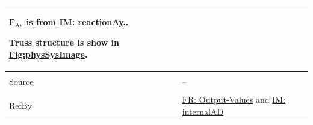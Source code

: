 \documentclass[12pt]{article}
\begin{document}
\begin{minipage}{\textwidth}
\begin{tabular}{>{\raggedright}p{}>{\raggedright\arraybackslash}p{}}
        ${\mathbf{F}_{\text{Ay}}}$ is from \hyperref[IM:reactionAy]{IM: reactionAy}..
        
        Truss structure is show in \hyperref[Figure:physSysImage]{Fig:physSysImage}.
        
\\ \midrule \\
Source & --
         
\\ \midrule \\
RefBy & \hyperref[outputValues]{FR: Output-Values} and \hyperref[IM:internalAD]{IM: internalAD}
        
\\ \bottomrule
\end{tabular}
\end{minipage}
\end{document}
